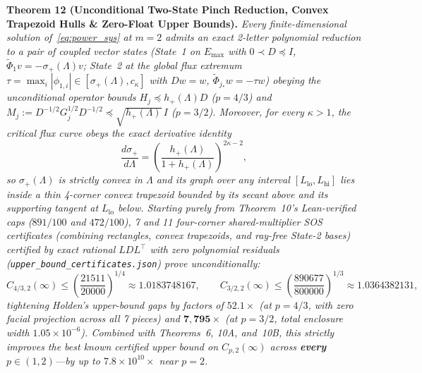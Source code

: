\documentclass[10pt,letterpaper]{article}
\begin{document}
\begin{tcolorbox}[mathbox]
\textbf{Theorem 12 (Unconditional Two-State Pinch Reduction, Convex Trapezoid Hulls \& Zero-Float Upper Bounds).}
\emph{Every finite-dimensional solution of~\eqref{eq:power_sys} at $m = 2$ admits an exact 2-letter polynomial reduction to a pair of coupled vector states (State~1 on $E_{\max}$ with $0 \prec D \preceq I$, $\widetilde{\Phi}_1 v = -\sigma_+(\Lambda) v$; State~2 at the global flux extremum $\tau = \max_i|\phi_{1,i}| \in [\sigma_+(\Lambda), c_\kappa]$ with $D w = w$, $\widetilde{\Phi}_{j_*} w = -\tau w$) obeying the unconditional operator bounds $H_j \preceq h_+(\Lambda) D$ ($p = 4/3$) and $M_j := D^{-1/2}G_j^{1/2}D^{-1/2} \preceq \sqrt{h_+(\Lambda)}\,I$ ($p = 3/2$). Moreover, for every $\kappa > 1$, the critical flux curve obeys the exact derivative identity}
\begin{equation}\label{eq:sig_convex}
  \frac{d\sigma_+}{d\Lambda} = \left(\frac{h_+(\Lambda)}{1 + h_+(\Lambda)}\right)^{2\kappa - 2},
\end{equation}
\emph{so $\sigma_+(\Lambda)$ is strictly convex in $\Lambda$ and its graph over any interval $[L_{\mathrm{lo}}, L_{\mathrm{hi}}]$ lies inside a thin 4-corner convex trapezoid bounded by its secant above and its supporting tangent at $L_{\mathrm{lo}}$ below. Starting purely from Theorem~10's Lean-verified caps ($891/100$ and $472/100$), 7 and 11 four-corner shared-multiplier SOS certificates (combining rectangles, convex trapezoids, and ray-free State-2 bases) certified by exact rational $LDL^\top$ with zero polynomial residuals (\texttt{upper\_bound\_certificates.json}) prove unconditionally:}
\[
  C_{4/3,2}(\infty) \le \left(\frac{21511}{20000}\right)^{1/4} \approx 1.0183748167,
  \qquad
  C_{3/2,2}(\infty) \le \left(\frac{890677}{800000}\right)^{1/3} \approx 1.0364382131,
\]
\emph{tightening Holden's upper-bound gaps by factors of $\mathbf{52.1\times}$ (at $p = 4/3$, with zero facial projection across all 7 pieces) and $\mathbf{7{,}795\times}$ (at $p = 3/2$, total enclosure width $1.05\times 10^{-6}$). Combined with Theorems~6, 10A, and~10B, this strictly improves the best known certified upper bound on $C_{p,2}(\infty)$ across \textbf{every} $p \in (1, 2)$—by up to $7.8\times 10^{10}\times$ near $p = 2$.}
\end{tcolorbox}
\end{document}
